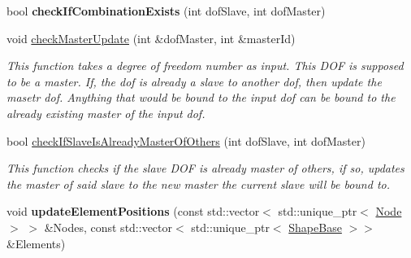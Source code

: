 \begin{DoxyCompactItemize}
\item 
\hypertarget{classNewtonRaphsonSolver_a9cdedabbc023ac182c924b1ec6c3804d}{}bool {\bfseries check\+If\+Combination\+Exists} (int dof\+Slave, int dof\+Master)\label{classNewtonRaphsonSolver_a9cdedabbc023ac182c924b1ec6c3804d}

\item 
void \hyperlink{classNewtonRaphsonSolver_a1cc04a2a1d6132eb01437f318bcb5103}{check\+Master\+Update} (int \&dof\+Master, int \&master\+Id)
\begin{DoxyCompactList}\small\item\em This function takes a degree of freedom number as input. This D\+O\+F is supposed to be a master. If, the dof is already a slave to another dof, then update the masetr dof. Anything that would be bound to the input dof can be bound to the already existing master of the input dof. \end{DoxyCompactList}\item 
bool \hyperlink{classNewtonRaphsonSolver_ab4dd0fae0f0d56355521fbd22875bda8}{check\+If\+Slave\+Is\+Already\+Master\+Of\+Others} (int dof\+Slave, int dof\+Master)
\begin{DoxyCompactList}\small\item\em This function checks if the slave D\+O\+F is already master of others, if so, updates the master of said slave to the new master the current slave will be bound to. \end{DoxyCompactList}\item 
\hypertarget{classNewtonRaphsonSolver_a7065afed801c6edf31a76c9578b325ea}{}void {\bfseries update\+Element\+Positions} (const std\+::vector$<$ std\+::unique\+\_\+ptr$<$ \hyperlink{classNode}{Node} $>$ $>$ \&Nodes, const std\+::vector$<$ std\+::unique\+\_\+ptr$<$ \hyperlink{classShapeBase}{Shape\+Base} $>$$>$ \&Elements)\label{classNewtonRaphsonSolver_a7065afed801c6edf31a76c9578b325ea}

\end{DoxyCompactItemize}
